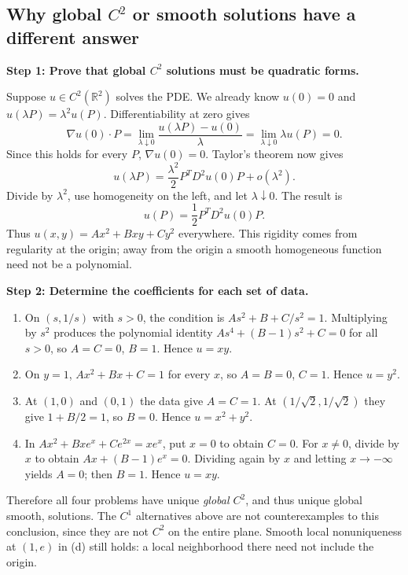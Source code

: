 \documentclass[11pt,a4paper]{article}
\newcommand{\R}{\mathbb R}
\newcommand{\step}[1]{\par\medskip\textbf{#1}\par}
\begin{document}
\subsection*{Why global $C^2$ or smooth solutions have a different answer}
\step{Step 1: Prove that global $C^2$ solutions must be quadratic forms.}
Suppose $u\in C^2(\R^2)$ solves the PDE. We already know $u(0)=0$ and $u(\lambda P)=\lambda^2u(P)$. Differentiability at zero gives
\[
 \nabla u(0)\cdot P
 =\lim_{\lambda\downarrow0}\frac{u(\lambda P)-u(0)}{\lambda}
 =\lim_{\lambda\downarrow0}\lambda u(P)=0.
\]
Since this holds for every $P$, $\nabla u(0)=0$. Taylor's theorem now gives
\[
 u(\lambda P)=\frac{\lambda^2}{2}P^T D^2u(0)P+o(\lambda^2).
\]
Divide by $\lambda^2$, use homogeneity on the left, and let $\lambda\downarrow0$. The result is
\[
 u(P)=\frac12P^TD^2u(0)P.
\]
Thus $u(x,y)=Ax^2+Bxy+Cy^2$ everywhere. This rigidity comes from regularity at the origin; away from the origin a smooth homogeneous function need not be a polynomial.

\step{Step 2: Determine the coefficients for each set of data.}
\begin{enumerate}[label=(\alph*)]
\item On $(s,1/s)$ with $s>0$, the condition is $As^2+B+C/s^2=1$. Multiplying by $s^2$ produces the polynomial identity $As^4+(B-1)s^2+C=0$ for all $s>0$, so $A=C=0$, $B=1$. Hence $u=xy$.
\item On $y=1$, $Ax^2+Bx+C=1$ for every $x$, so $A=B=0$, $C=1$. Hence $u=y^2$.
\item At $(1,0)$ and $(0,1)$ the data give $A=C=1$. At $(1/\sqrt2,1/\sqrt2)$ they give $1+B/2=1$, so $B=0$. Hence $u=x^2+y^2$.
\item In $Ax^2+Bxe^x+Ce^{2x}=xe^x$, put $x=0$ to obtain $C=0$. For $x\ne0$, divide by $x$ to obtain $Ax+(B-1)e^x=0$. Dividing again by $x$ and letting $x\to-\infty$ yields $A=0$; then $B=1$. Hence $u=xy$.
\end{enumerate}
Therefore all four problems have unique \emph{global $C^2$}, and thus unique global smooth, solutions. The $C^1$ alternatives above are not counterexamples to this conclusion, since they are not $C^2$ on the entire plane. Smooth local nonuniqueness at $(1,e)$ in (d) still holds: a local neighborhood there need not include the origin.
\end{document}
